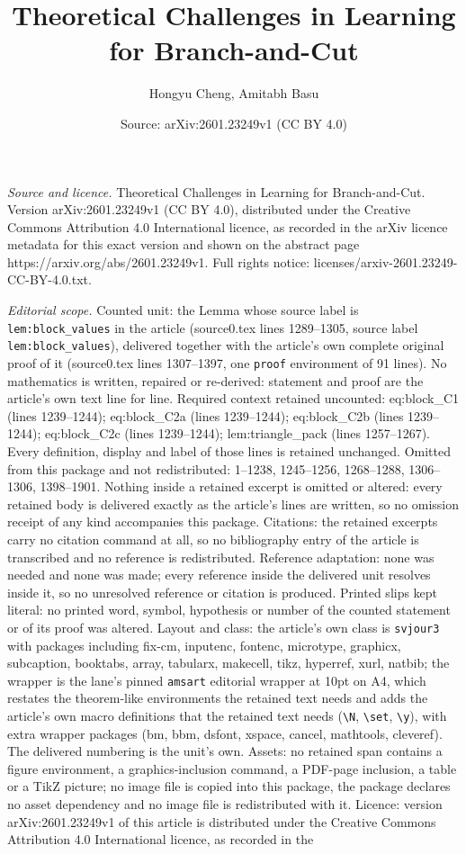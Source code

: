 \documentclass[10pt,a4paper]{amsart}
\title[Theoretical Challenges in Learning for Branch-and-Cut]{Theoretical Challenges in Learning for Branch-and-Cut}
\author{Hongyu Cheng, Amitabh Basu}
\date{Source: arXiv:2601.23249v1 (CC BY 4.0)}
\begin{document}
\maketitle

\noindent\emph{Source and licence.} Theoretical Challenges in Learning for Branch-and-Cut. Version arXiv:2601.23249v1 (CC BY 4.0), distributed under the Creative Commons Attribution 4.0 International licence, as recorded in the arXiv licence metadata for this exact version and shown on the abstract page https://arxiv.org/abs/2601.23249v1. Full rights notice: licenses/arxiv-2601.23249-CC-BY-4.0.txt.\par\smallskip

\noindent\textit{Editorial scope.} Counted unit: the Lemma whose source label is \texttt{lem:block\_values} in the article (source0.tex lines 1289--1305, source label \texttt{lem:block\_values}), delivered together with the article's own complete original proof of it (source0.tex lines 1307--1397, one \texttt{proof} environment of 91 lines). No mathematics is written, repaired or re-derived: statement and proof are the article's own text line for line. Required context retained uncounted: eq:block\_C1 (lines 1239--1244); eq:block\_C2a (lines 1239--1244); eq:block\_C2b (lines 1239--1244); eq:block\_C2c (lines 1239--1244); lem:triangle\_pack (lines 1257--1267). Every definition, display and label of those lines is retained unchanged. Omitted from this package and not redistributed: 1--1238, 1245--1256, 1268--1288, 1306--1306, 1398--1901. Nothing inside a retained excerpt is omitted or altered: every retained body is delivered exactly as the article's lines are written, so no omission receipt of any kind accompanies this package. Citations: the retained excerpts carry no citation command at all, so no bibliography entry of the article is transcribed and no reference is redistributed. Reference adaptation: none was needed and none was made; every reference inside the delivered unit resolves inside it, so no unresolved reference or citation is produced. Printed slips kept literal: no printed word, symbol, hypothesis or number of the counted statement or of its proof was altered. Layout and class: the article's own class is \texttt{svjour3} with packages including fix-cm, inputenc, fontenc, microtype, graphicx, subcaption, booktabs, array, tabularx, makecell, tikz, hyperref, xurl, natbib; the wrapper is the lane's pinned \texttt{amsart} editorial wrapper at 10pt on A4, which restates the theorem-like environments the retained text needs and adds the article's own macro definitions that the retained text needs (\texttt{\textbackslash N}, \texttt{\textbackslash set}, \texttt{\textbackslash y}), with extra wrapper packages (bm, bbm, dsfont, xspace, cancel, mathtools, cleveref). The delivered numbering is the unit's own. Assets: no retained span contains a figure environment, a graphics-inclusion command, a PDF-page inclusion, a table or a TikZ picture; no image file is copied into this package, the package declares no asset dependency and no image file is redistributed with it. Licence: version arXiv:2601.23249v1 of this article is distributed under the Creative Commons Attribution 4.0 International licence, as recorded in the 
\end{document}
